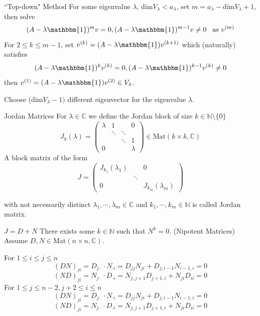 \documentclass{beamer}
\begin{document}
\begin{frame}
\begin{block}{``Top-down" Method}
For some eigenvalue $ \lambda$, dim$V_{\lambda}<a_{\lambda}$, set $m=a_{\lambda}-\text{dim}V_{\lambda}+1$, then solve
$$(A-\lambda\mathbbm{1})^mv=0,(A-\lambda\mathbbm{1})^{m-1}v\neq0 \hspace{3mm}\text{as }v^{(m)}$$
For $2\leqslant k\leqslant m-1$, set $v^{(k)}=(A-\lambda\mathbbm{1})v^{(k+1)}$ which (naturally) satisfies
$$(A-\lambda\mathbbm{1})^{k}v^{(k)}=0,(A-\lambda\mathbbm{1})^{k-1}v^{(k)}\neq0$$
then $v^{(1)}=(A-\lambda\mathbbm{1})v^{(2)}\in V_{\lambda}$.
\end{block}
\begin{block}{}
Choose (dim$V_{\lambda}-1)$ different eigenvector for the eigenvalue $\lambda$. 
\end{block}
\end{frame}

\begin{frame}
\begin{block}{Jordan Matrices}
For $\lambda\in\mathbb{C}$ we define the Jordan block of size $k\in\mathbb{N}\setminus\lbrace0\rbrace$
$$J_k(\lambda)=\begin{pmatrix}
\lambda&1&&0\\
&\ddots&\ddots&\\
&&\ddots&1\\
0&&&\lambda
\end{pmatrix}\in\text{Mat}(k\times k,\mathbb{C})$$
A block matrix of the form
$$J=\begin{pmatrix}
J_{k_1}(\lambda_1)&&0\\
&\ddots&\\
0&&J_{k_m}(\lambda_m)
\end{pmatrix}$$
\end{block}
with not necessarily distinct $\lambda_1,\cdots,\lambda_m\in\mathbb{C}$ and $k_1,\cdots,k_m\in\mathbb{N}$ is called Jordan matrix.
\end{frame}


\begin{frame}
\begin{block}{$J=D+N$}
There exists some $k\in\mathbb{N}$ such that $N^k=0$. (Nipotent Matrices)
Assume $D,N\in$Mat$(n\times n,\mathbb{C})$.
\begin{block}{}
For $1\leqslant i\leqslant j\leqslant n$
$$(DN)_{ji}=D_{j\cdot}\cdot N_{\cdot i}=D_{jj}N_{ji}+D_{j,i-1}N_{i-1,i}=0$$
$$(ND)_{ji}=N_{j\cdot}\cdot D_{\cdot i}=N_{j,j+1}D_{j+1,i}+N_{ji}D_{ii}=0$$
For $1\leqslant j\leqslant n-2,j+2\leqslant i\leqslant n$
$$(DN)_{ji}=D_{j\cdot}\cdot N_{\cdot i}=D_{jj}N_{ji}+D_{j,i-1}N_{i-1,i}=0$$
$$(ND)_{ji}=N_{j\cdot}\cdot D_{\cdot i}=N_{j,j+1}D_{j+1,i}+N_{ji}D_{ii}=0$$
\end{block}

\end{block}
\end{frame}
\end{document}
